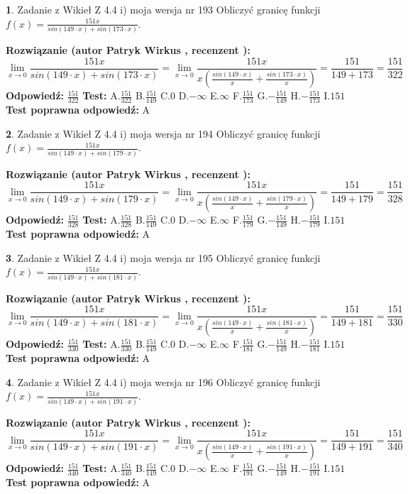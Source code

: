 \documentclass[12pt, a4paper]{article}
\theoremstyle{definition} %
\newtheorem{zad}{}
\newcommand{\zadStart}[1]{\begin{zad}#1\newline}
\newcommand{\zadStop}{\end{zad}}
\newcommand{\rozwStart}[2]{\noindent \textbf{Rozwiązanie (autor #1 , recenzent #2): }\newline}
\newcommand{\rozwStop}{\newline}
\newcommand{\odpStart}{\noindent \textbf{Odpowiedź:}\newline}
\newcommand{\odpStop}{\newline}
\newcommand{\testStart}{\noindent \textbf{Test:}\newline}
\newcommand{\testStop}{\newline}
\newcommand{\kluczStart}{\noindent \textbf{Test poprawna odpowiedź:}\newline}
\newcommand{\kluczStop}{\newline}
\begin{document}
\zadStart{Zadanie z Wikieł Z 4.4 i) moja wersja nr 193}
Obliczyć granicę funkcji $f(x)=\frac{151x}{sin(149\cdot x) +sin(173\cdot x)}$.
\zadStop
\rozwStart{Patryk Wirkus}{}
$$\lim\limits_{x\to 0}\frac{151x}{sin(149\cdot x) +sin(173\cdot x)}=\lim\limits_{x\to 0}\frac{151x}{x(\frac{sin(149\cdot x)}{x}+\frac{sin(173\cdot x)}{x})}=\frac{151}{149+173} = \frac{151}{322}$$
\rozwStop
\odpStart
$\frac{151}{322}$
\odpStop
\testStart
A.$\frac{151}{322}$
B.$\frac{151}{149}$
C.$0$
D.$-\infty$
E.$\infty$
F.$\frac{151}{173}$
G.$-\frac{151}{149}$
H.$-\frac{151}{173}$
I.$151$
\testStop
\kluczStart
A
\kluczStop



\zadStart{Zadanie z Wikieł Z 4.4 i) moja wersja nr 194}
Obliczyć granicę funkcji $f(x)=\frac{151x}{sin(149\cdot x) +sin(179\cdot x)}$.
\zadStop
\rozwStart{Patryk Wirkus}{}
$$\lim\limits_{x\to 0}\frac{151x}{sin(149\cdot x) +sin(179\cdot x)}=\lim\limits_{x\to 0}\frac{151x}{x(\frac{sin(149\cdot x)}{x}+\frac{sin(179\cdot x)}{x})}=\frac{151}{149+179} = \frac{151}{328}$$
\rozwStop
\odpStart
$\frac{151}{328}$
\odpStop
\testStart
A.$\frac{151}{328}$
B.$\frac{151}{149}$
C.$0$
D.$-\infty$
E.$\infty$
F.$\frac{151}{179}$
G.$-\frac{151}{149}$
H.$-\frac{151}{179}$
I.$151$
\testStop
\kluczStart
A
\kluczStop



\zadStart{Zadanie z Wikieł Z 4.4 i) moja wersja nr 195}
Obliczyć granicę funkcji $f(x)=\frac{151x}{sin(149\cdot x) +sin(181\cdot x)}$.
\zadStop
\rozwStart{Patryk Wirkus}{}
$$\lim\limits_{x\to 0}\frac{151x}{sin(149\cdot x) +sin(181\cdot x)}=\lim\limits_{x\to 0}\frac{151x}{x(\frac{sin(149\cdot x)}{x}+\frac{sin(181\cdot x)}{x})}=\frac{151}{149+181} = \frac{151}{330}$$
\rozwStop
\odpStart
$\frac{151}{330}$
\odpStop
\testStart
A.$\frac{151}{330}$
B.$\frac{151}{149}$
C.$0$
D.$-\infty$
E.$\infty$
F.$\frac{151}{181}$
G.$-\frac{151}{149}$
H.$-\frac{151}{181}$
I.$151$
\testStop
\kluczStart
A
\kluczStop



\zadStart{Zadanie z Wikieł Z 4.4 i) moja wersja nr 196}
Obliczyć granicę funkcji $f(x)=\frac{151x}{sin(149\cdot x) +sin(191\cdot x)}$.
\zadStop
\rozwStart{Patryk Wirkus}{}
$$\lim\limits_{x\to 0}\frac{151x}{sin(149\cdot x) +sin(191\cdot x)}=\lim\limits_{x\to 0}\frac{151x}{x(\frac{sin(149\cdot x)}{x}+\frac{sin(191\cdot x)}{x})}=\frac{151}{149+191} = \frac{151}{340}$$
\rozwStop
\odpStart
$\frac{151}{340}$
\odpStop
\testStart
A.$\frac{151}{340}$
B.$\frac{151}{149}$
C.$0$
D.$-\infty$
E.$\infty$
F.$\frac{151}{191}$
G.$-\frac{151}{149}$
H.$-\frac{151}{191}$
I.$151$
\testStop
\kluczStart
A
\kluczStop
\end{document}
